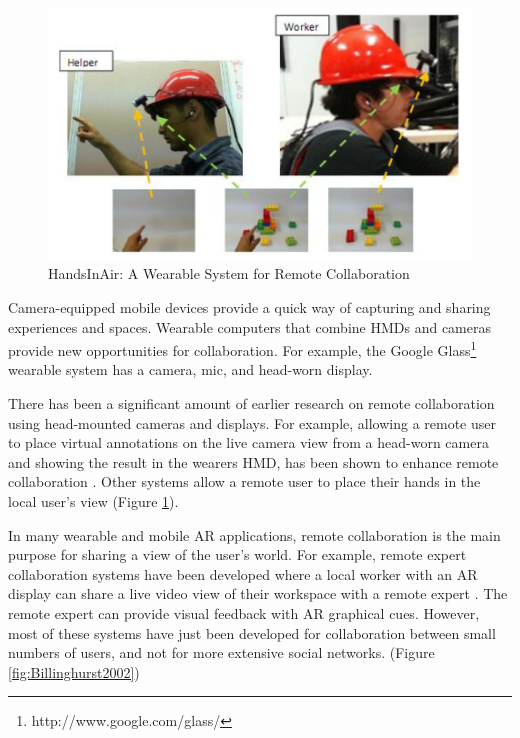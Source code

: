 \begin{figure}
    \centering
    \includegraphics[width=\linewidth]{images/Huang2013.PNG}
    \caption{HandsInAir: A Wearable System for Remote Collaboration}
    \label{fig:HandsInAir}
\end{figure}

Camera-equipped mobile devices provide a quick way of capturing and sharing experiences and spaces. Wearable computers that combine HMDs and cameras provide new opportunities for collaboration. For example, the Google Glass\footnote{http://www.google.com/glass/} wearable system has a camera, mic, and head-worn display.

There has been a significant amount of earlier research on remote collaboration using head-mounted cameras and displays. For example, allowing a remote user to place virtual annotations on the live camera view from a head-worn camera and showing the result in the wearers HMD, has been shown to enhance remote collaboration \cite{Fussell2003}. Other systems allow a remote user to place their hands in the local user's view \cite{Huang2013} (Figure \ref{fig:HandsInAir}). 

In many wearable and mobile AR applications, remote collaboration is the main purpose for sharing a view of the user's world. For example, remote expert collaboration systems have been developed where a local worker with an AR display can share a live video view of their workspace with a remote expert \cite{Billinghurst2002}. The remote expert can provide visual feedback with AR graphical cues.  However, most of these systems have just been developed for collaboration between small numbers of users, and not for more extensive social networks. (Figure \ref{fig:Billinghurst2002})

